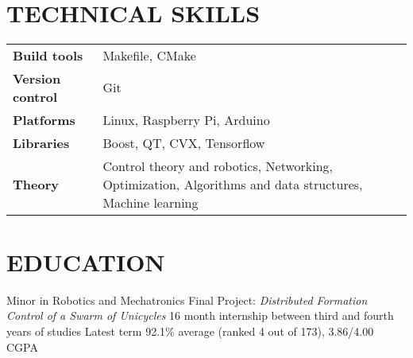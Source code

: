 \documentclass{ResumeTemplate}
\begin{document}
    \fontsize{10}{12}\selectfont

    \centering{}
    ~

    \raggedright\begin{minipage}[c]{0.65\linewidth} 

        \section{TECHNICAL SKILLS}

        \noindent\begin{tabularx}{\linewidth}{>{\bfseries}lX}
           Build tools     & Makefile, CMake \\
           Version control & Git \\
           Platforms       & Linux, Raspberry Pi, Arduino \\
           Libraries       & Boost, QT, CVX, Tensorflow \\
           Theory          & Control theory and robotics, Networking, Optimization, Algorithms and data structures, Machine learning
        \end{tabularx}

        \section{EDUCATION}




        \workitemsfour
        {Minor in Robotics and Mechatronics}
        {Final Project: \textit{Distributed Formation Control of a Swarm of Unicycles}}
        {16 month internship between third and fourth years of studies}
        {Latest term 92.1\% average (ranked 4 out of 173), 3.86/4.00 CGPA}
    

\end{minipage}
\end{document}

